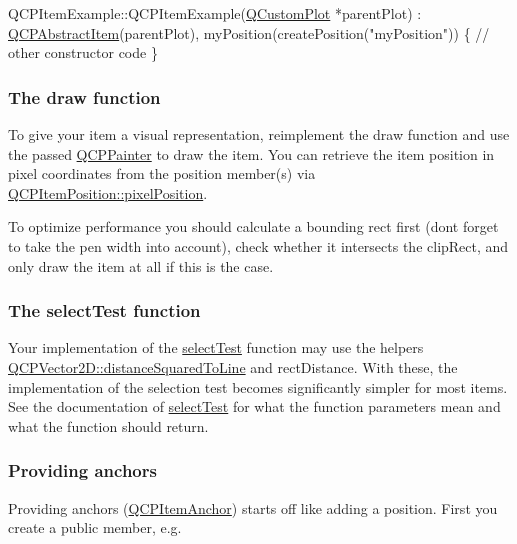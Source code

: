 \begin{DoxyCode}
QCPItemExample::QCPItemExample(\mbox{\hyperlink{class_q_custom_plot}{QCustomPlot}} *parentPlot) :
  \mbox{\hyperlink{class_q_c_p_abstract_item}{QCPAbstractItem}}(parentPlot),
  myPosition(createPosition(\textcolor{stringliteral}{"myPosition"}))
\{
  \textcolor{comment}{// other constructor code}
\}
\end{DoxyCode}
\hypertarget{class_q_c_p_abstract_item_items-drawing}{}\subsubsection{The draw function}\label{class_q_c_p_abstract_item_items-drawing}
To give your item a visual representation, reimplement the draw function and use the passed \mbox{\hyperlink{class_q_c_p_painter}{Q\+C\+P\+Painter}} to draw the item. You can retrieve the item position in pixel coordinates from the position member(s) via \mbox{\hyperlink{class_q_c_p_item_position_a3b5a12a8e5081c1a5bb878ffdcfa92ad}{Q\+C\+P\+Item\+Position\+::pixel\+Position}}.

To optimize performance you should calculate a bounding rect first (don\textquotesingle{}t forget to take the pen width into account), check whether it intersects the clip\+Rect, and only draw the item at all if this is the case.\hypertarget{class_q_c_p_abstract_item_items-selection}{}\subsubsection{The select\+Test function}\label{class_q_c_p_abstract_item_items-selection}
Your implementation of the \mbox{\hyperlink{class_q_c_p_abstract_item_ae41d0349d68bb802c49104afd100ba2a}{select\+Test}} function may use the helpers \mbox{\hyperlink{class_q_c_p_vector2_d_a14840cd3da80cfee4eb3f8977cab89ab}{Q\+C\+P\+Vector2\+D\+::distance\+Squared\+To\+Line}} and rect\+Distance. With these, the implementation of the selection test becomes significantly simpler for most items. See the documentation of \mbox{\hyperlink{class_q_c_p_abstract_item_ae41d0349d68bb802c49104afd100ba2a}{select\+Test}} for what the function parameters mean and what the function should return.\hypertarget{class_q_c_p_abstract_item_anchors}{}\subsubsection{Providing anchors}\label{class_q_c_p_abstract_item_anchors}
Providing anchors (\mbox{\hyperlink{class_q_c_p_item_anchor}{Q\+C\+P\+Item\+Anchor}}) starts off like adding a position. First you create a public member, e.\+g.


